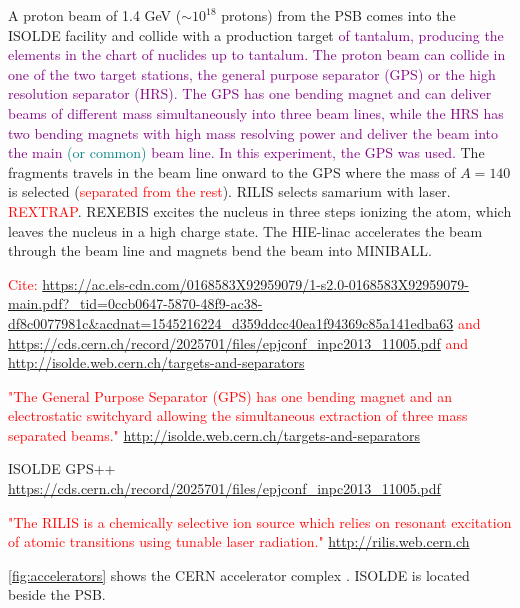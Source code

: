 \documentclass[twoside,english]{uiofysmaster/uiofysmaster}
\begin{document}
A proton beam of 1.4 GeV ($\sim 10^{18}$ protons) from the PSB comes into the ISOLDE facility and collide with a production target \textcolor{purple}{of tantalum, producing the elements in the chart of nuclides up to tantalum. The proton beam can collide in one of the two target stations, the general purpose separator (GPS) or the high resolution separator (HRS). The GPS has one bending magnet and can deliver beams of different mass simultaneously into three beam lines, while the HRS has two bending magnets with high mass resolving power and deliver the beam into the main \textcolor{teal}{(or common)} beam line. In this experiment, the GPS was used.} The fragments travels in the beam line onward to the GPS where the mass of $A = 140$ is selected (\textcolor{red}{separated from the rest}). RILIS selects samarium with laser. \textcolor{red}{REXTRAP}. REXEBIS excites the nucleus in three steps ionizing the atom, which leaves the nucleus in a high charge state. The HIE-linac accelerates the beam through the beam line and magnets bend the beam into MINIBALL. 

\textcolor{red}{Cite: \url{https://ac.els-cdn.com/0168583X92959079/1-s2.0-0168583X92959079-main.pdf?_tid=0ccb0647-5870-48f9-ac38-df8c0077981c&acdnat=1545216224_d359ddcc40ea1f94369c85a141edba63} and \url{https://cds.cern.ch/record/2025701/files/epjconf_inpc2013_11005.pdf} and \url{http://isolde.web.cern.ch/targets-and-separators}}

\bigskip

\textcolor{red}{"The General Purpose Separator (GPS) has one bending magnet and an electrostatic switchyard allowing the simultaneous extraction of three mass separated beams." \url{http://isolde.web.cern.ch/targets-and-separators}}

\bigskip

ISOLDE GPS++ \url{https://cds.cern.ch/record/2025701/files/epjconf_inpc2013_11005.pdf}

\bigskip

\textcolor{red}{"The RILIS is a chemically selective ion source which relies on resonant excitation of atomic transitions using tunable laser radiation." \url{http://rilis.web.cern.ch}} 

\bigskip

\autoref{fig:accelerators} shows the CERN accelerator complex \cite{CERN-AC}. ISOLDE is located beside the PSB.
\end{document}
